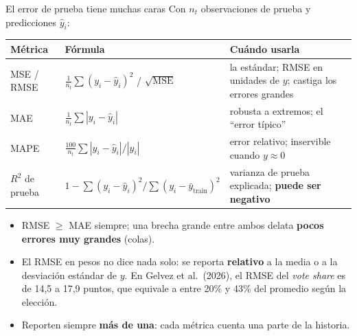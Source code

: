 \documentclass{beamer}
\newcommand{\1}{\mathbb{I}}
\newcommand{\MSE}{\mathrm{MSE}}
\begin{document}
\begin{frame}{El error de prueba tiene muchas caras}
\small
Con $n_{t}$ observaciones de prueba y predicciones $\hat{y}_i$:
\vspace{0.1cm}
\begin{center}
\scriptsize
\setlength{\tabcolsep}{4pt}
\renewcommand{\arraystretch}{1.25}
\begin{tabular}{llp{4.3cm}}
\hline
Métrica & Fórmula & Cuándo usarla \\
\hline
MSE / RMSE & $\frac{1}{n_t}\sum (y_i - \hat{y}_i)^2$ \; / \; $\sqrt{\MSE}$ & la estándar; RMSE en unidades de $y$; castiga los errores grandes \\
MAE & $\frac{1}{n_t}\sum |y_i - \hat{y}_i|$ & robusta a extremos; el ``error típico'' \\
MAPE & $\frac{100}{n_t}\sum |y_i - \hat{y}_i| / |y_i|$ & error relativo; inservible cuando $y \approx 0$ \\
$R^2$ de prueba & $1 - \sum (y_i - \hat{y}_i)^2 \big/ \sum (y_i - \bar{y}_{\text{train}})^2$ & varianza de prueba explicada; \textbf{puede ser negativo} \\
\hline
\end{tabular}
\end{center}
\pause
\vspace{0.15cm}
\begin{itemize}\itemsep3pt
  \item RMSE $\geq$ MAE siempre; una brecha grande entre ambos delata \textbf{pocos errores muy grandes} (colas).
  \item El RMSE en pesos no dice nada solo: se reporta \textbf{relativo} a la media o a la desviación estándar de $y$. En Gelvez et al.\ (2026), el RMSE del \emph{vote share} es de 14,5 a 17,9 puntos, que equivale a entre 20\% y 43\% del promedio según la elección. \pause
  \item Reporten siempre \textbf{más de una}: cada métrica cuenta una parte de la historia.
\end{itemize}
\end{frame}
\end{document}
